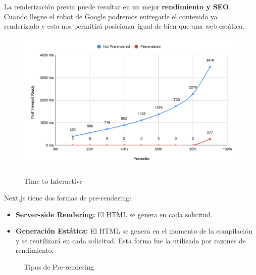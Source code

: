\documentclass[12pt,twoside,titlepage]{report}
\begin{document}
\begin{itemize}
       La renderización previa puede resultar en un mejor \textbf{rendimiento y SEO}. Cuando llegue el robot de Google podremos entregarle el contenido ya renderizado y esto nos permitirá posicionar igual de bien que una web estática.

    \begin{figure}[H]
        \centering
        \includegraphics[scale=0.16]{Nextjs/PrerenderComparation}
        \label{fig:nextjs_prerenderinggraph}
        \caption{Time to Interactive}
    \end{figure}
    

    Next.js tiene dos formas de pre-rendering:
    \begin{itemize}
        \item \textbf{Server-side Rendering:} El HTML se genera en cada solicitud.
        \item \textbf{Generación Estática:} El HTML se genera en el momento de la compilación y se reutilizará en cada solicitud. Esta forma fue la utilizada por razones de rendimiento.
    \end{itemize}
    \begin{figure}[H]
        \centering
        \caption{Tipos de Pre-rendering}
        \label{f:TiposPrerendering}
       \end{figure}


\end{itemize}
\end{document}

